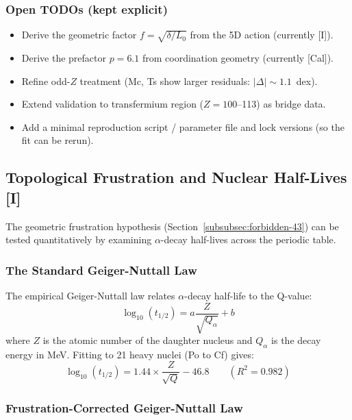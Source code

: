 \subsubsection*{Open TODOs (kept explicit)}
\begin{itemize}
    \item Derive the geometric factor $f = \sqrt{\delta/L_0}$ from the 5D action (currently [I]).
    \item Derive the prefactor $p = 6.1$ from coordination geometry (currently [Cal]).
    \item Refine odd-$Z$ treatment (Mc, Ts show larger residuals: $|\Delta| \sim 1.1$~dex).
    \item Extend validation to transfermium region ($Z = 100$--113) as bridge data.
    \item Add a minimal reproduction script / parameter file and lock versions (so the fit can be rerun).
\end{itemize}

\subsection{Topological Frustration and Nuclear Half-Lives [I]}
\label{subsec:frustration-halflives}

The geometric frustration hypothesis (Section~\ref{subsubsec:forbidden-43}) can be tested quantitatively by examining $\alpha$-decay half-lives across the periodic table.

\subsubsection{The Standard Geiger-Nuttall Law}

The empirical Geiger-Nuttall law relates $\alpha$-decay half-life to the Q-value:
\begin{equation}
    \log_{10}(t_{1/2}) = a \frac{Z}{\sqrt{Q_\alpha}} + b
    \label{eq:geiger-nuttall-standard}
\end{equation}
where $Z$ is the atomic number of the daughter nucleus and $Q_\alpha$ is the decay energy in MeV. Fitting to 21 heavy nuclei (Po to Cf) gives:
\begin{equation}
    \log_{10}(t_{1/2}) = 1.44 \times \frac{Z}{\sqrt{Q}} - 46.8 \qquad (R^2 = 0.982)
\end{equation}

\subsubsection{Frustration-Corrected Geiger-Nuttall Law}

